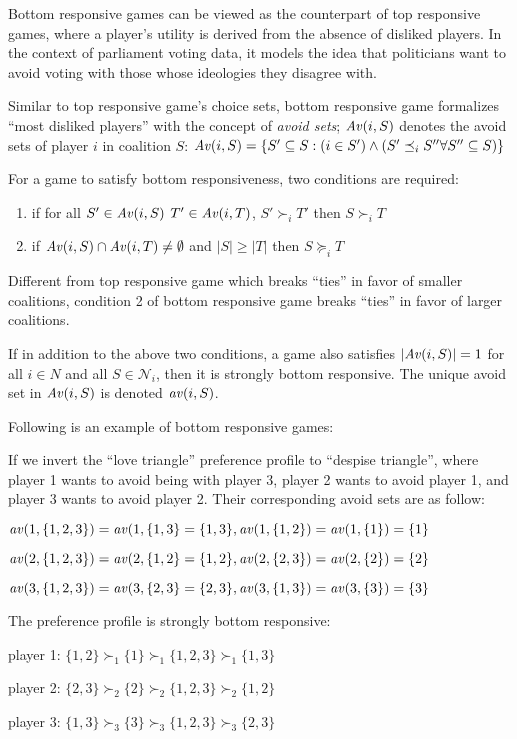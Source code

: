 Bottom responsive games can be viewed as the counterpart of top responsive games,
where a player's utility is derived from the absence of disliked players.
In the context of parliament voting data, it models the idea that politicians want
to avoid voting with those whose ideologies they disagree with.

Similar to top responsive game's choice sets, bottom responsive game formalizes
``most disliked players'' with the concept of \textit{avoid sets};
$\mathit{Av}(i, S)$ denotes the avoid sets of player $i$ in coalition $S$: $\mathit{Av}(i, S) =
\{S' \subseteq S: (i \in S') \wedge (S' \preceq_i S'' \forall S'' \subseteq S)\}$

For a game to satisfy bottom responsiveness, two conditions are required:

\begin{enumerate}
  \item if for all $S' \in \mathit{Av}(i, S)$ $T' \in \mathit{Av}(i, T)$, $ S' \succ_i T'$
    then $S \succ_i T$
  \item if $\mathit{Av}(i, S) \cap \mathit{Av}(i, T) \neq \emptyset$ and $|S| \geq |T|$
    then $S \succeq_i T$
\end{enumerate}

Different from top responsive game which breaks ``ties'' in favor of
smaller coalitions, condition 2 of bottom responsive game breaks ``ties'' in
favor of larger coalitions.

If in addition to the above two conditions, a game also satisfies
$|\mathit{Av}(i, S)| = 1$ for all $i \in N$ and all $S \in \mathcal{N}_i$,
then it is strongly bottom responsive. The unique avoid set in $\mathit{Av}(i, S)$
is denoted $\mathit{av}(i, S)$.

Following is an example of bottom responsive games:

\begin{example}
\label{example:bottom_responsive_pref}
  If we invert the ``love triangle'' preference profile to ``despise triangle'',
  where player 1 wants to avoid being with player 3,
  player 2 wants to avoid player 1, and player 3 wants to avoid player 2.
  Their corresponding avoid sets are as follow:
    
  $\mathit{av}(1, \{1, 2, 3\}) = \mathit{av}(1, \{1, 3\} = \{1, 3\},
   \mathit{av}(1, \{1, 2\}) = \mathit{av}(1, \{1\}) = \{1\}$

  $\mathit{av}(2, \{1, 2, 3\}) = \mathit{av}(2, \{1, 2\} = \{1, 2\},
   \mathit{av}(2, \{2, 3\}) = \mathit{av}(2, \{2\}) = \{2\}$

  $\mathit{av}(3, \{1, 2, 3\}) = \mathit{av}(3, \{2, 3\} = \{2, 3\},
   \mathit{av}(3, \{1, 3\}) = \mathit{av}(3, \{3\}) = \{3\}$
  
  The preference profile is strongly bottom responsive:

  player 1: $\{1, 2\} \succ_1 \{1\} \succ_1 \{1, 2, 3\} \succ_1 \{1, 3\}$

  player 2: $\{2, 3\} \succ_2 \{2\} \succ_2 \{1, 2, 3\} \succ_2 \{1, 2\}$

  player 3: $\{1, 3\} \succ_3 \{3\} \succ_3 \{1, 2, 3\} \succ_3 \{2, 3\}$
\end{example}

